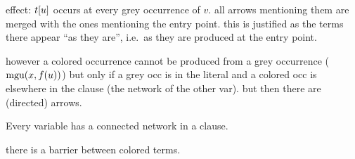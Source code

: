 \documentclass[,%
	paper=a4,%
	DIV11, %
	twoside=false,%
	liststotoc,
	bibtotoc,
	draft=false,%
	numbers=noendperiod
]{scrartcl}
\begin{document}
effect: 
$t[u]$ occurs at every grey occurrence of $v$. all arrows mentioning them are merged with the ones mentioning the entry point.
this is justified as the terms there appear ``as they are'', i.e.\ as they are produced at the entry point.

however a colored occurrence cannot be produced from a grey occurrence ($\operatorname{mgu}(x, f(u))$) but only if a grey occ is in the literal and a colored occ is elsewhere in the clause (the network of the other var). but then there are (directed) arrows.


Every variable has a connected network in a clause. 

there is a barrier between colored terms.

~

~
\end{document}
